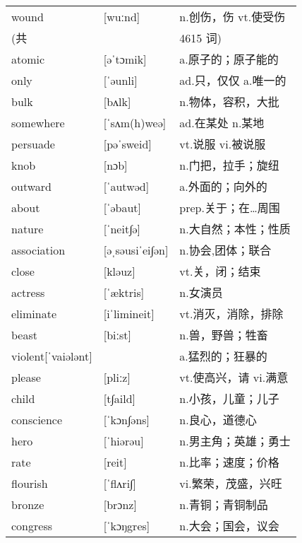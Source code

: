 \documentclass[a4paper]{article}
\begin{document}
\section{}
\begin{tabular}{l l l}

wound & [wuːnd] & n.创伤，伤 vt.使受伤 \\
(共 &  & 4615 词) \\
atomic & [əˈtɔmik] & a.原子的；原子能的 \\
only & [ˈəunli] & ad.只，仅仅 a.唯一的 \\
bulk & [bʌlk] & n.物体，容积，大批 \\
somewhere & [ˈsʌm(h)weə] & ad.在某处 n.某地 \\
persuade & [pəˈsweid] & vt.说服 vi.被说服 \\
knob & [nɔb] & n.门把，拉手；旋纽 \\
outward & [ˈautwəd] & a.外面的；向外的 \\
about & [ˈəbaut] & prep.关于；在…周围 \\
nature & [ˈneit∫ə] & n.大自然；本性；性质 \\
association & [əˌsəusiˈei∫ən] & n.协会,团体；联合 \\
close & [kləuz] & vt.关，闭；结束 \\
actress & [ˈæktris] & n.女演员 \\
eliminate & [iˈlimineit] & vt.消灭，消除，排除 \\
beast & [biːst] & n.兽，野兽；牲畜 \\
violent[ˈvaiələnt] &  & a.猛烈的；狂暴的 \\
please & [pliːz] & vt.使高兴，请 vi.满意 \\
child & [t∫aild] & n.小孩，儿童；儿子 \\
conscience & [ˈkɔn∫əns] & n.良心，道德心 \\
hero & [ˈhiərəu] & n.男主角；英雄；勇士 \\
rate & [reit] & n.比率；速度；价格 \\
flourish & [ˈflʌri∫] & vi.繁荣，茂盛，兴旺 \\
bronze & [brɔnz] & n.青铜；青铜制品 \\
congress & [ˈkɔŋgres] & n.大会；国会，议会 \\

\end{tabular}
\end{document}
